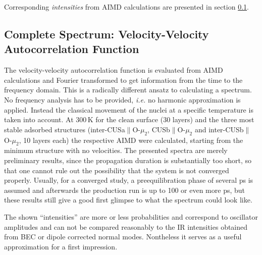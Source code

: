 \documentclass[11pt,DIV=13,BCOR=5mm,a4paper,headinclude]{scrbook}
\begin{document}
Corresponding \textit{intensities} from AIMD calculations are presented in section \ref{vvacf}.
\clearpage
\subsection{Complete Spectrum: Velocity-Velocity Autocorrelation Function}\label{vvacf}

The velocity-velocity autocorrelation function is evaluated from AIMD calculations and Fourier transformed to get information from the time to the frequency domain.
This is a radically different ansatz to calculating a spectrum.
No frequency analysis has to be provided, \textit{i.e.} no harmonic approximation is applied.
Instead the classical movement of the nuclei at a specific temperature is taken into account.
At $300\,$K for the clean surface (30 layers) and the three most stable adsorbed structures (inter-CUSa$\parallel$O-$\mu_2$, CUSb$\parallel$O-$\mu_2$ and inter-CUSb$\parallel$O-$\mu_2$, 10 layers each) the respective AIMD were calculated, starting from the minimum structure with no velocities.
The presented spectra are merely preliminary results, since the propagation duration is substantially too short, so that one cannot rule out the possibility that the system is not converged properly.
Usually, for a converged study, a preequilibration phase of several ps is assumed and afterwards the production run is up to 100 or even more ps, but these results still give a good first glimpse to what the spectrum could look like.


The shown ``intensities'' are more or less probabilities and correspond to oscillator amplitudes and can not be compared reasonably to the IR intensities obtained from BEC or dipole corrected normal modes.
Nontheless it serves as a useful approximation for a first impression.
\end{document}
